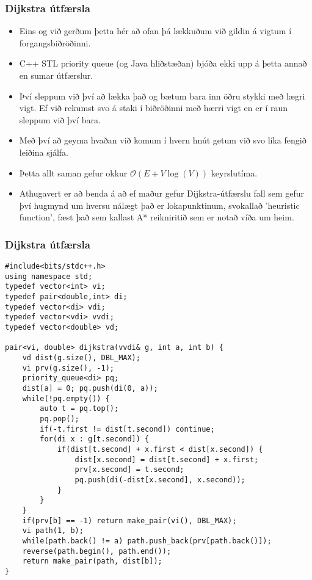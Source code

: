 \documentclass{beamer}
\begin{document}
\begin{frame}
\frametitle{Dijkstra útfærsla}

\begin{itemize}

\item<1-> Eins og við gerðum þetta hér að ofan þá lækkuðum við gildin á vigtum í forgangsbiðröðinni.

\item<2-> C++ STL priority queue (og Java hliðstæðan) bjóða ekki upp á þetta annað en sumar útfærslur.

\item<3-> Því sleppum við því að lækka það og bætum bara inn öðru stykki með lægri vigt. Ef við rekumst svo á staki í biðröðinni með hærri vigt en er í raun sleppum við því bara.

\item<4-> Með því að geyma hvaðan við komum í hvern hnút getum við svo líka fengið leiðina sjálfa.

\item<5-> Þetta allt saman gefur okkur $\mathcal{O}(E + V\log(V))$ keyrslutíma.

\item<6-> Athugavert er að benda á að ef maður gefur Dijkstra-útfærslu fall sem gefur því hugmynd um hversu nálægt það er lokapunktinum, svokallað 'heuristic function', fæst það sem kallast A* reikniritið sem er notað víða um heim.

\end{itemize}

\end{frame}

\begin{frame}[fragile]
\frametitle{Dijkstra útfærsla}

\begin{tiny}
\begin{verbatim}
#include<bits/stdc++.h>
using namespace std;
typedef vector<int> vi;
typedef pair<double,int> di;
typedef vector<di> vdi;
typedef vector<vdi> vvdi;
typedef vector<double> vd;

pair<vi, double> dijkstra(vvdi& g, int a, int b) {
    vd dist(g.size(), DBL_MAX);
    vi prv(g.size(), -1);
    priority_queue<di> pq;
    dist[a] = 0; pq.push(di(0, a));
    while(!pq.empty()) {
        auto t = pq.top();
        pq.pop();
        if(-t.first != dist[t.second]) continue;
        for(di x : g[t.second]) {
            if(dist[t.second] + x.first < dist[x.second]) {
                dist[x.second] = dist[t.second] + x.first;
                prv[x.second] = t.second;
                pq.push(di(-dist[x.second], x.second));
            }
        }
    }
    if(prv[b] == -1) return make_pair(vi(), DBL_MAX);
    vi path(1, b);
    while(path.back() != a) path.push_back(prv[path.back()]);
    reverse(path.begin(), path.end());
    return make_pair(path, dist[b]);
}
\end{verbatim}
\end{tiny}

\end{frame}
\end{document}
